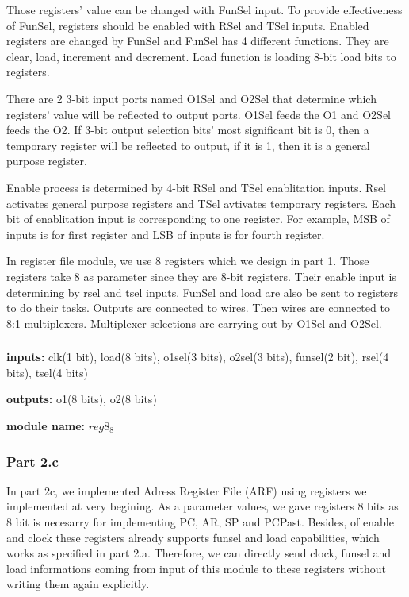 \documentclass[pdftex,12pt,a4paper]{article}
\begin{document}
Those registers' value can be changed 
with FunSel input. To provide effectiveness of FunSel, registers should be enabled
with RSel and TSel inputs. Enabled registers are changed by FunSel and FunSel has
4 different functions. They are clear, load, increment and decrement. Load function
is loading 8-bit load bits to registers.

There are 2 3-bit input ports named O1Sel and O2Sel that determine which registers' 
value will be reflected to output ports. O1Sel feeds the O1 and O2Sel feeds the O2.
If 3-bit output selection bits' most significant bit is 0, then a temporary register
will be reflected to output, if it is 1, then it is a general purpose register.

Enable process is determined by 4-bit RSel and TSel enablitation inputs. Rsel activates
general purpose registers and TSel avtivates temporary registers. Each bit of
enablitation input is corresponding to one register. For example, MSB of inputs is
for first register and LSB of inputs is for fourth register.

In register file module, we use 8 registers which we design in part 1. Those registers
take 8 as parameter since they are 8-bit registers. Their enable input is determining by
rsel and tsel inputs. FunSel and load are also be sent to registers to do their tasks.
Outputs are connected to wires. Then wires are connected to 8:1 multiplexers. Multiplexer
selections are carrying out by O1Sel and O2Sel. 

\subsubsection{}
\textbf{inputs:} clk(1 bit),
load(8 bits),
o1sel(3 bits),
o2sel(3 bits),
funsel(2 bit),
rsel(4 bits),
tsel(4 bits)

\textbf{outputs:} 
o1(8 bits),
o2(8 bits)

\textbf{module name:} $reg8_8$

\subsubsection{Part 2.c}
In part 2c, we implemented Adress Register File (ARF) using registers we implemented at 
very begining. As a parameter values, we gave registers 8 bits as 8 bit is necesarry for 
implementing PC, AR, SP and PCPast. Besides, of enable and clock these registers 
already supports funsel and load capabilities, which works as specified in part 2.a. 
Therefore, we can directly send clock, funsel and load informations coming from 
input of this module to these registers without writing them again explicitly.
\end{document}
